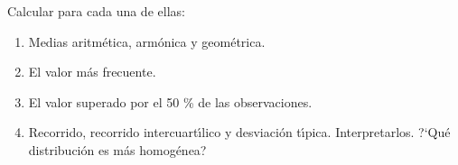 \documentclass[11pt]{book}
\begin{document}
\begin{enumerate}
Calcular para cada una de ellas:
  \begin{enumerate}
    \item Medias aritm{\'e}tica, arm{\'o}nica y geom{\'e}trica.
    \item El valor m{\'a}s frecuente.
    \item El valor superado por el 50 \% de las observaciones.
    \item Recorrido,   recorrido   intercuart{\'\i}lico   y   desviaci{\'o}n t{\'\i}pica.
          Interpretarlos. ?`Qu{\'e} distribuci{\'o}n es m{\'a}s homog{\'e}nea?
  \end{enumerate}
\vskip 0.3cm

%
%
%
%


\end{enumerate}
\end{document}
